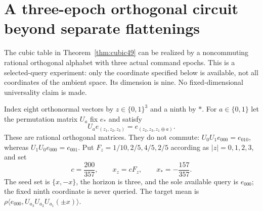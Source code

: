 \section{A three-epoch orthogonal circuit beyond separate flattenings}
\label{sec:orthogonal50}
The cubic table in Theorem~\ref{thm:cubic49} can be realized by a
noncommuting rational orthogonal alphabet with three actual command
epochs. This is a selected-query experiment: only the coordinate
specified below is available, not all coordinates of the ambient space.
Its dimension is nine. No fixed-dimensional universality claim is made.

Index eight orthonormal vectors by $z\in\{0,1\}^3$ and a ninth by $*$.
For $a\in\{0,1\}$ let the permutation matrix $U_a$ fix $e_*$ and satisfy
\begin{equation}\label{eq:permutation50}
 U_ae_{(z_1,z_2,z_3)}=e_{(z_2,z_3,z_1\mathbin\oplus a)}.
\end{equation}
These are rational orthogonal matrices. They do not commute:
$U_0U_1e_{000}=e_{010}$, whereas $U_1U_0e_{000}=e_{001}$.
Put $F_z=1/10,2/5,4/5,2/5$ according as $|z|=0,1,2,3$, and set
\begin{equation}\label{eq:seed50}
 c=\frac{200}{357},\qquad x_z=cF_z,\qquad x_*=-\frac{157}{357}.
\end{equation}
The seed set is $\{x,-x\}$, the horizon is three, and the sole available
query is $e_{000}$; the fixed ninth coordinate is never queried. The target mean is
$\rho\langle e_{000},U_{a_3}U_{a_2}U_{a_1}(\pm x)\rangle$.


